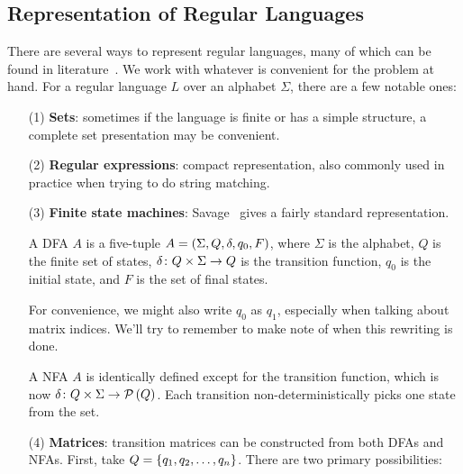 \documentclass[12pt]{article}
\begin{document}
\subsection{Representation of Regular Languages}
There are several ways to represent regular languages,
many of which can be found in literature~\cite{savage1998models}.
We work with whatever is convenient for the problem at hand.
For a regular language \(L\) over an alphabet \(\Sigma\),
there are a few notable ones:


\begin{enumerate}
  \item[(1)]
    \textbf{Sets}:
    sometimes if the language is finite or has a simple structure,
    a complete set presentation may be convenient.

  \item[(2)]
    \textbf{Regular expressions}:
    compact representation,
    also commonly used in practice when trying to do string matching.

  \item[(3)]
    \textbf{Finite state machines}:
    Savage~\cite{savage1998models} gives a fairly standard representation.

    \begin{definition}[DFA]
      A DFA \(A\) is a five-tuple \(A = \left(\Sigma, Q, \delta, q_0, F\right)\),
      where \(\Sigma\) is the alphabet, \(Q\) is the finite set of states,
      \(\delta \colon Q \times \Sigma \to Q\) is the transition function,
      \(q_0\) is the initial state, and \(F\) is the set of final states.
    \end{definition}

    For convenience, we might also write \(q_0\) as \(q_1\),
    especially when talking about matrix indices.
    We'll try to remember to make note of when this rewriting is done.

    \begin{definition}[NFA]
      A NFA \(A\) is identically defined except for the
      transition function, which is now
      \(\delta \colon Q \times \Sigma \to \mathcal{P}\left(Q\right)\).
      Each transition non-deterministically picks one state from the set.
    \end{definition}

  \item[(4)]
    \textbf{Matrices}:
    transition matrices can be constructed from both DFAs and NFAs.
    First, take \(Q = \left\{q_1, q_2, \ldots, q_n\right\}\).
    There are two primary possibilities:


\end{enumerate}
\end{document}
